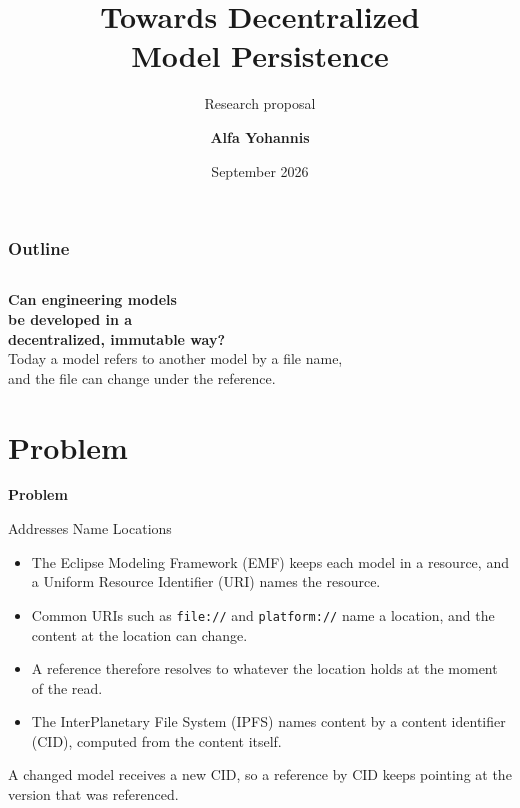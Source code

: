 \documentclass[aspectratio=169, table, 12pt]{beamer}
\title{\Huge Towards Decentralized\\ \vspace{10pt} Model Persistence}
\subtitle{Research proposal}
\author{\textbf{Alfa Yohannis}}
\date{September 2026}
\begin{document}
\frame{\titlepage}

\begin{frame}
  \frametitle{Outline}
  \vspace{20pt}
  \begin{columns}[t]
    \tableofcontents[sections={1-3}]
    \tableofcontents[sections={4-5}]
  \end{columns}
\end{frame}

\begin{frame}{\hfill}
  \centering
  \huge{\textbf{Can engineering models\\[6pt] be developed in a\\[6pt] decentralized, immutable way?}}\\[22pt]
  \large Today a model refers to another model by a file name,\\
  and the file can change under the reference.
\end{frame}

\section{Problem}

\begin{frame}{\hfill}
  \centering
  \Huge{\textbf{Problem}}
\end{frame}

\begin{frame}{{\Large Addresses Name Locations}}
  \vspace{10pt}
  \begin{itemize}
    \item The Eclipse Modeling Framework (EMF) keeps each model in a resource,
          and a Uniform Resource Identifier (URI) names the resource.
    \item Common URIs such as \texttt{file://} and \texttt{platform://} name a
          location, and the content at the location can change.
    \item A reference therefore resolves to whatever the location holds at the
          moment of the read.
    \item The InterPlanetary File System (IPFS) names content by a content
          identifier (CID), computed from the content itself.
  \end{itemize}
  \vspace{8pt}
  {\footnotesize A changed model receives a new CID, so a reference by CID keeps
  pointing at the version that was referenced.}
\end{frame}
\end{document}
